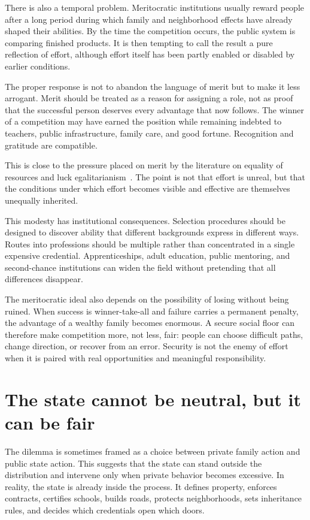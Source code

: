 ﻿\documentclass[12pt,a4paper]{book}
\begin{document}
There is also a temporal problem.  Meritocratic institutions usually reward
people after a long period during which family and neighborhood effects have
already shaped their abilities.  By the time the competition occurs, the
public system is comparing finished products.  It is then tempting to call
the result a pure reflection of effort, although effort itself has been
partly enabled or disabled by earlier conditions.

The proper response is not to abandon the language of merit but to make it
less arrogant.  Merit should be treated as a reason for assigning a role,
not as proof that the successful person deserves every advantage that now
follows.  The winner of a competition may have earned the position while
remaining indebted to teachers, public infrastructure, family care, and
good fortune.  Recognition and gratitude are compatible.

This is close to the pressure placed on merit by the literature on equality
of resources and luck egalitarianism~\cite{Dworkin2000,Anderson1999}.  The
point is not that effort is unreal, but that the conditions under which
effort becomes visible and effective are themselves unequally inherited.

This modesty has institutional consequences.  Selection procedures should
be designed to discover ability that different backgrounds express in
different ways.  Routes into professions should be multiple rather than
concentrated in a single expensive credential.  Apprenticeships, adult
education, public mentoring, and second-chance institutions can widen the
field without pretending that all differences disappear.

The meritocratic ideal also depends on the possibility of losing without
being ruined.  When success is winner-take-all and failure carries a
permanent penalty, the advantage of a wealthy family becomes enormous.  A
secure social floor can therefore make competition more, not less, fair:
people can choose difficult paths, change direction, or recover from an
error.  Security is not the enemy of effort when it is paired with real
opportunities and meaningful responsibility.

\section{The state cannot be neutral, but it can be fair}

The dilemma is sometimes framed as a choice between private family action
and public state action.  This suggests that the state can stand outside the
distribution and intervene only when private behavior becomes excessive.
In reality, the state is already inside the process.  It defines property,
enforces contracts, certifies schools, builds roads, protects neighborhoods,
sets inheritance rules, and decides which credentials open which doors.
\end{document}

